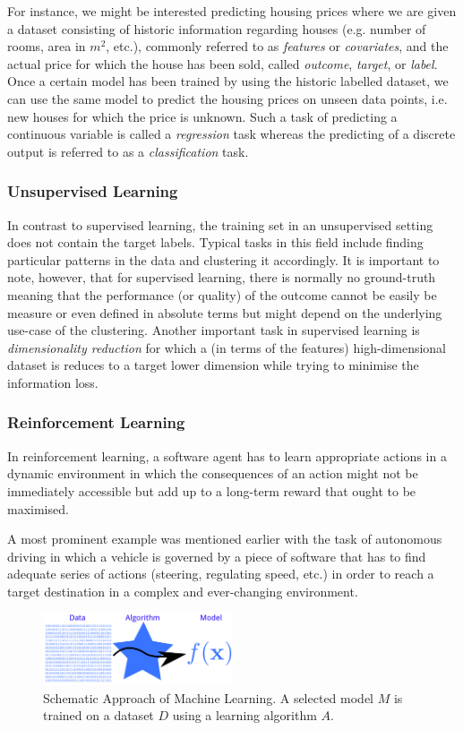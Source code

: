 For instance, we might be interested predicting housing prices where we are given a dataset consisting of historic information regarding houses (e.g. number of rooms, area in $m^2$, etc.), commonly referred  to as \emph{features} or \emph{covariates}, and the actual price for which the house has been sold, called \emph{outcome}, \emph{target}, or \emph{label}. Once a certain model has been trained by using the historic labelled dataset, we can use the same model to predict the housing prices on unseen data points, i.e. new houses for which the price is unknown. Such a task of predicting a continuous variable is called a \emph{regression} task whereas the predicting of a discrete output is referred to as a \emph{classification} task. 

\subsubsection{Unsupervised Learning} 
In contrast to supervised learning, the training set in an unsupervised setting does not contain the target labels. Typical tasks in this field include finding particular patterns in the data and clustering it accordingly. It is important to note, however, that for supervised learning, there is normally no ground-truth meaning that the performance (or quality) of the outcome cannot be easily be measure or even defined in absolute terms but might depend on the underlying use-case of the clustering. Another important task in supervised learning is \emph{dimensionality reduction} for which a (in terms of the features) high-dimensional dataset is reduces to a target lower dimension while trying to minimise the information loss. 

\subsubsection{Reinforcement Learning}
In reinforcement learning, a software agent has to learn appropriate actions in a dynamic environment in which the consequences of an action might not be immediately accessible but add up to a long-term reward that ought to be maximised. 

A most prominent example was mentioned earlier with the task of autonomous driving in which a vehicle is governed by a piece of software that has to find adequate series of actions (steering, regulating speed, etc.) in order to reach a target destination in a complex and ever-changing environment. 


\begin{figure}[]
	\label{fig:machine-learning-approach}
	\caption{Schematic Approach of Machine Learning. A selected model $M$ is trained on a dataset $D$ using a learning algorithm $A$.}
	\centering
	\includegraphics[width=0.5\textwidth]{figures/chapter-2/machine-learning-approach.png}
\end{figure}
